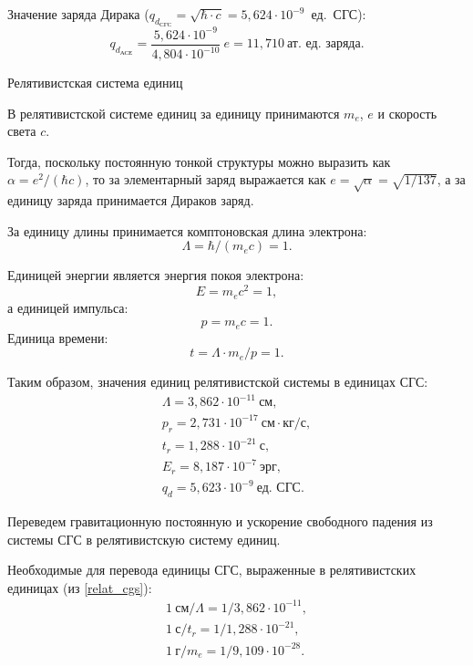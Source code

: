\documentclass[10pt,a4paper]{extarticle}
\makeatletter
\renewcommand\subsection{\@startsection{subsection}{2}{\z@}{2ex}{2ex}
  {\normalfont\normalsize\bfseries}}
\makeatother
\begin{document}
  Значение заряда Дирака (\( q_{d_\text{СГС}} = \sqrt{\hbar \cdot c} =
  5,\!624 \cdot 10^{-9} \)~ед.~СГС):
  \[
    q_{d_\text{АСЕ}} = \frac{5,\!624 \cdot 10^{-9}}{4,\!804 \cdot 10^{-10}}\ e
      = 11,\!710~\text{ат.~ед.~заряда}.
  \]

  \subsection{Релятивистская система единиц}

  В релятивистской системе единиц за единицу принимаются \( m_e \), \( e \) и
  скорость света \( c \).

  Тогда, поскольку постоянную тонкой структуры можно выразить как
  \( \alpha = e^2 / (\hbar c) \), то за элементарный заряд выражается как
  \( e = \sqrt{\alpha} = \sqrt{1 / 137} \), а за единицу заряда принимается
  Дираков заряд.
  
  За единицу длины принимается комптоновская длина электрона:
  \[
    \Lambda = \hbar / (m_e c) = 1.
  \]
  
  Единицей энергии является энергия покоя электрона:
  \[
    E = m_e c^2 = 1,
  \]
  а единицей импульса:
  \[
    p = m_e c = 1.
  \]
  Единица времени:
  \[
    t = \Lambda \cdot m_e / p = 1.
  \]

  Таким образом, значения единиц релятивистской системы в единицах СГС:
  \begin{equation}
    \begin{array}{c}
      \Lambda = 3,\!862 \cdot 10^{-11}~\text{см}, \\
      p_r = 2,\!731 \cdot 10^{-17}~\text{см} \cdot \text{кг}/\text{с}, \\
      t_r = 1,\!288 \cdot 10^{-21}~\text{с}, \\
      E_r = 8,\!187 \cdot 10^{-7}~\text{эрг}, \\
      q_d = 5,\!623 \cdot 10^{-9}~\text{ед.~СГС}.
    \end{array}
    \label{relat_cgs}
  \end{equation}

  Переведем гравитационную постоянную и ускорение свободного падения из системы
  СГС в релятивистскую систему единиц.

  Необходимые для перевода единицы СГС, выраженные в релятивистских единицах
  (из \eqref{relat_cgs}):
  \begin{gather*}
    1~\text{см} / \Lambda = 1 / 3,\!862 \cdot 10^{-11}, \\
    1~\text{с} / t_r = 1 / 1,\!288 \cdot 10^{-21}, \\
    1~\text{г} / m_e = 1 / 9,\!109 \cdot 10^{-28}.
  \end{gather*}
\end{document}
